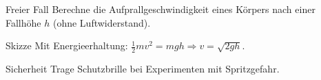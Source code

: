 \documentclass[11pt,a4paper,oneside]{article}
\begin{document}
	\begin{aufgabe}{Freier Fall}
		Berechne die Aufprallgeschwindigkeit eines Körpers nach einer Fallhöhe $h$ (ohne Luftwiderstand).
	\end{aufgabe}
	
	\begin{loesung}{Skizze}
		Mit Energieerhaltung: $\frac12 mv^2 = mgh \Rightarrow v=\sqrt{2gh}$.
	\end{loesung}
	
	\begin{infobox}{Sicherheit}
		Trage Schutzbrille bei Experimenten mit Spritzgefahr.
	\end{infobox}
	
\end{document}
